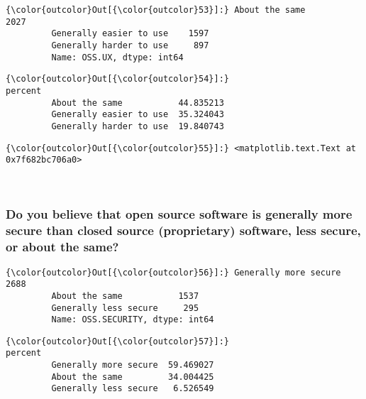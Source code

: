 \documentclass[11pt]{article}
\begin{document}
            \begin{Verbatim}[commandchars=\\\{\}]
{\color{outcolor}Out[{\color{outcolor}53}]:} About the same             2027
         Generally easier to use    1597
         Generally harder to use     897
         Name: OSS.UX, dtype: int64
\end{Verbatim}
        

            \begin{Verbatim}[commandchars=\\\{\}]
{\color{outcolor}Out[{\color{outcolor}54}]:}                            percent
         About the same           44.835213
         Generally easier to use  35.324043
         Generally harder to use  19.840743
\end{Verbatim}
        

            \begin{Verbatim}[commandchars=\\\{\}]
{\color{outcolor}Out[{\color{outcolor}55}]:} <matplotlib.text.Text at 0x7f682bc706a0>
\end{Verbatim}
        
    \begin{center}
    \end{center}
    { \hspace*{\fill} \\}
    
    \subsubsection{Do you believe that open source software is generally
more secure than closed source (proprietary) software, less secure, or
about the
same?}\label{do-you-believe-that-open-source-software-is-generally-more-secure-than-closed-source-proprietary-software-less-secure-or-about-the-same}


            \begin{Verbatim}[commandchars=\\\{\}]
{\color{outcolor}Out[{\color{outcolor}56}]:} Generally more secure    2688
         About the same           1537
         Generally less secure     295
         Name: OSS.SECURITY, dtype: int64
\end{Verbatim}
        

            \begin{Verbatim}[commandchars=\\\{\}]
{\color{outcolor}Out[{\color{outcolor}57}]:}                          percent
         Generally more secure  59.469027
         About the same         34.004425
         Generally less secure   6.526549
\end{Verbatim}
        
\end{document}

